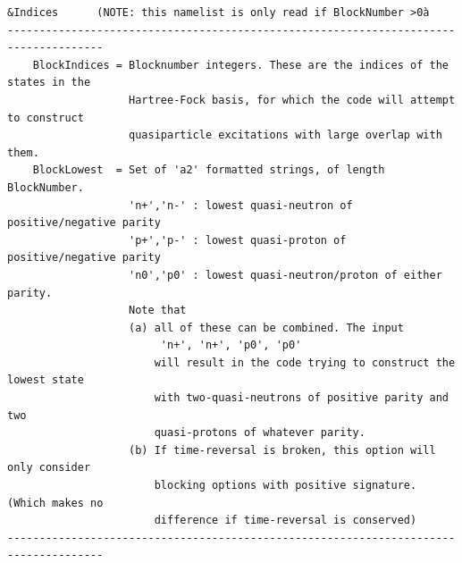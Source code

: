 \documentclass[print,amsmath,amssymb,aps,prc,nofootinbib,notitlepage]{revtex4-1}
\begin{document}
\begin{Verbatim}
&Indices      (NOTE: this namelist is only read if BlockNumber >0à
-------------------------------------------------------------------------------------
    BlockIndices = Blocknumber integers. These are the indices of the states in the 
                   Hartree-Fock basis, for which the code will attempt to construct
                   quasiparticle excitations with large overlap with them.
    BlockLowest  = Set of 'a2' formatted strings, of length BlockNumber.
                   'n+','n-' : lowest quasi-neutron of positive/negative parity
                   'p+','p-' : lowest quasi-proton of positive/negative parity
                   'n0','p0' : lowest quasi-neutron/proton of either parity.
                   Note that
                   (a) all of these can be combined. The input
                        'n+', 'n+', 'p0', 'p0'
                       will result in the code trying to construct the lowest state
                       with two-quasi-neutrons of positive parity and two 
                       quasi-protons of whatever parity.
                   (b) If time-reversal is broken, this option will only consider
                       blocking options with positive signature. (Which makes no 
                       difference if time-reversal is conserved)
-------------------------------------------------------------------------------------
\end{Verbatim}
\end{document}
